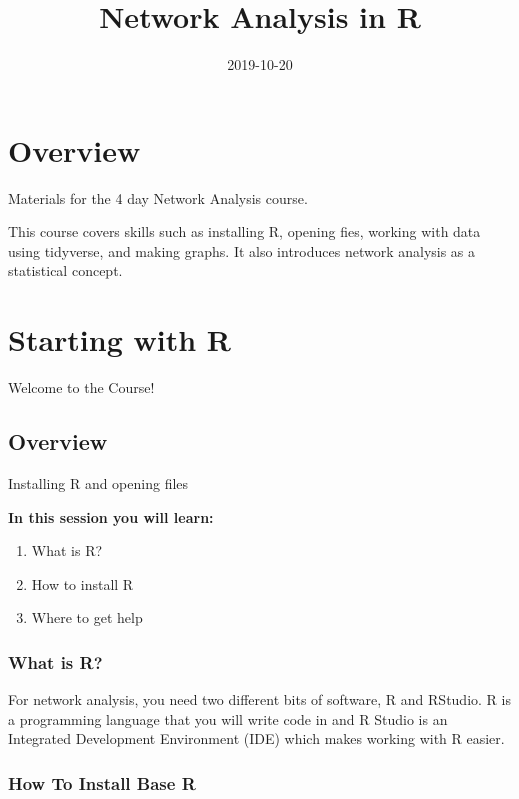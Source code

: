 \documentclass[]{book}
\title{Network Analysis in R}
\author{}
\date{2019-10-20}
\providecommand{\tightlist}{%
  \setlength{\itemsep}{0pt}\setlength{\parskip}{0pt}}
\begin{document}
\maketitle

{
\setcounter{tocdepth}{1}
\tableofcontents
}
\chapter*{Overview}\label{overview}

Materials for the 4 day Network Analysis course.

This course covers skills such as installing R, opening fies, working
with data using tidyverse, and making graphs. It also introduces network
analysis as a statistical concept.

\chapter{Starting with R}\label{starting-with-r}

{Welcome to the Course!}

\section{Overview}\label{overview-1}

Installing R and opening files

\textbf{In this session you will learn:}

\begin{enumerate}
\def\labelenumi{\arabic{enumi}.}
\tightlist
\item
  What is R?
\item
  How to install R
\item
  Where to get help
\end{enumerate}

\subsection{What is R?}\label{what-is-r}

For network analysis, you need two different bits of software, R and
RStudio. R is a programming language that you will write code in and R
Studio is an Integrated Development Environment (IDE) which makes
working with R easier.

\subsection{How To Install Base R}\label{how-to-install-base-r}
\end{document}
